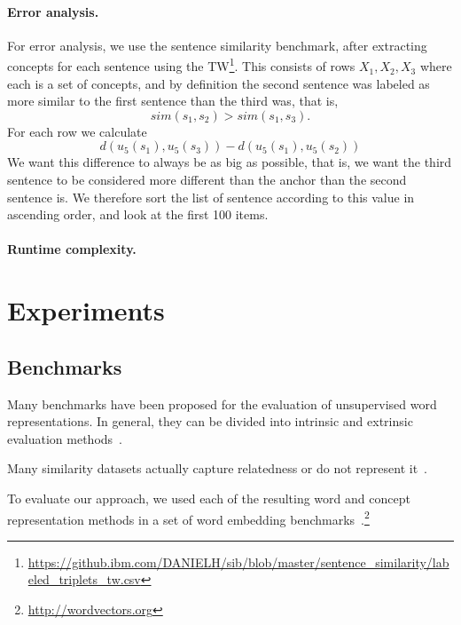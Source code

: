 \documentclass{article}
\begin{document}
    \paragraph{Error analysis.}
    For error analysis, we use the sentence similarity benchmark,
    after extracting concepts for each sentence using the
    TW\footnote{\url{https://github.ibm.com/DANIELH/sib/blob/master/sentence_similarity/labeled_triplets_tw.csv}}.
    This consists of rows $X_1,X_2,X_3$ where each is a set of concepts,
    and by definition the second sentence was labeled as more similar to the first
    sentence than the third was, that is,
    \[
        sim(s_1,s_2)>sim(s_1,s_3).
    \]
    For each row we calculate
    \[
        d(u_5(s_1),u_5(s_3)) - d(u_5(s_1),u_5(s_2))
    \]
    We want this difference to always be as big as possible,
    that is, we want the third sentence to be considered more different than
    the anchor than the second sentence is.
    We therefore sort the list of sentence according to this value
    in ascending order, and look at the first 100 items.

    \paragraph{Runtime complexity.}



    \section{Experiments}\label{sec:experiments}
    
    \subsection{Benchmarks}\label{sec:benchmarks}

    Many benchmarks have been proposed for the evaluation of unsupervised word
    representations.
    In general, they can be divided into intrinsic and extrinsic evaluation methods~\cite{schnabel2015evaluation,jastrzebski2017evaluate,alshargi2018concept2vec,bakarov2018survey,chiu2016intrinsic}.

    Many similarity datasets actually capture relatedness or do not represent it~\cite{hill2015simlex,avraham2016improving}.

    To evaluate our approach, we used each of the resulting word and concept
    representation methods in a set of word embedding
    benchmarks~\cite{faruqui-2014:SystemDemo}.\footnote{\url{http://wordvectors.org}}
    
\end{document}
